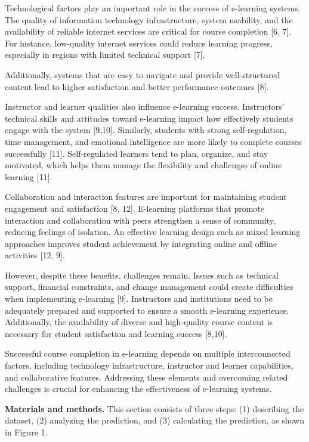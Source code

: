 \begin{multicols}{2}
Technological factors play an important role in the success of
e-learning systems. The quality of information technology
infrastructure, system usability, and the availability of reliable
internet services are critical for course completion {[}6, 7{]}. For
instance, low-quality internet services could reduce learning progress,
especially in regions with limited technical support {[}7{]}.

Additionally, systems that are easy to navigate and provide
well-structured content lead to higher satisfaction and better
performance outcomes {[}8{]}.

Instructor and learner qualities also influence e-learning success.
Instructors' technical skills and attitudes toward e-learning impact how
effectively students engage with the system {[}9,10{]}. Similarly,
students with strong self-regulation, time management, and emotional
intelligence are more likely to complete courses successfully {[}11{]}.
Self-regulated learners tend to plan, organize, and stay motivated,
which helps them manage the flexibility and challenges of online
learning {[}11{]}.

Collaboration and interaction features are important for maintaining
student engagement and satisfaction {[}8, 12{]}. E-learning platforms
that promote interaction and collaboration with peers strengthen a sense
of community, reducing feelings of isolation. An effective learning
design such as mixed learning approaches improves student achievement by
integrating online and offline activities {[}12, 9{]}.

However, despite these benefits, challenges remain. Issues such as
technical support, financial constraints, and change management could
create difficulties when implementing e-learning {[}9{]}. Instructors
and institutions need to be adequately prepared and supported to ensure
a smooth e-learning experience. Additionally, the availability of
diverse and high-quality course content is necessary for student
satisfaction and learning success {[}8,10{]}.

Successful course completion in e-learning depends on multiple
interconnected factors, including technology infrastructure, instructor
and learner capabilities, and collaborative features. Addressing these
elements and overcoming related challenges is crucial for enhancing the
effectiveness of e-learning systems.

{\bfseries Materials and methods.} This section consists of three steps:
(1) describing the dataset, (2) analyzing the prediction, and (3)
calculating the prediction, as shown in Figure 1.


\end{multicols}
